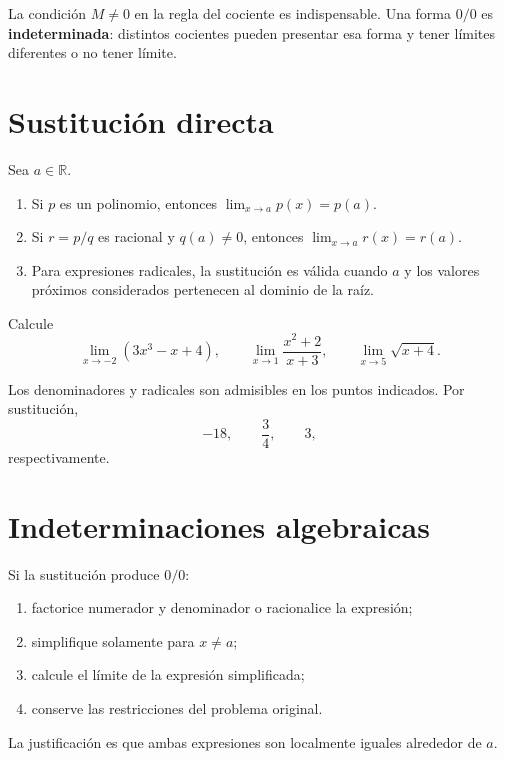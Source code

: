 \begin{nota}
La condición $M\neq0$ en la regla del cociente es indispensable. Una forma $0/0$ es \textbf{indeterminada}: distintos cocientes pueden presentar esa forma y tener límites diferentes o no tener límite.
\end{nota}

\section*{Sustitución directa}

\begin{proposicion}
Sea $a\in\mathbb{R}$.
\begin{enumerate}
  \item Si $p$ es un polinomio, entonces $\lim_{x\to a}p(x)=p(a)$.
  \item Si $r=p/q$ es racional y $q(a)\neq0$, entonces $\lim_{x\to a}r(x)=r(a)$.
  \item Para expresiones radicales, la sustitución es válida cuando $a$ y los valores próximos considerados pertenecen al dominio de la raíz.
\end{enumerate}
\end{proposicion}

\begin{ejemplo}
Calcule
\[
\lim_{x\to-2}(3x^3-x+4),\qquad
\lim_{x\to1}\frac{x^2+2}{x+3},\qquad
\lim_{x\to5}\sqrt{x+4}.
\]
\end{ejemplo}
\ifmostrarSoluciones
\begin{solucion}
Los denominadores y radicales son admisibles en los puntos indicados. Por sustitución,
\[
-18,\qquad \frac34,\qquad 3,
\]
respectivamente.
\end{solucion}
\else\vspace{15mm}\fi

\section*{Indeterminaciones algebraicas}

\begin{proposicion}
Si la sustitución produce $0/0$:
\begin{enumerate}
  \item factorice numerador y denominador o racionalice la expresión;
  \item simplifique solamente para $x\neq a$;
  \item calcule el límite de la expresión simplificada;
  \item conserve las restricciones del problema original.
\end{enumerate}
La justificación es que ambas expresiones son localmente iguales alrededor de $a$.
\end{proposicion}

